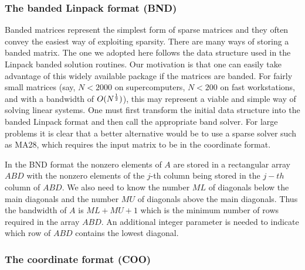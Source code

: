 \documentclass[12pt]{article}
\def\half{{1\over2}}%
\begin{document}
\subsubsection{The banded Linpack format (BND)} 
Banded matrices represent the simplest form of sparse matrices and
they often convey the easiest way of exploiting sparsity.  There are
many ways of storing a banded matrix. The one we adopted here follows
the data structure used in the Linpack banded solution routines. Our
motivation is that one can easily take advantage of this widely available 
package if the matrices are banded.  For fairly small matrices (say,
$N < 2000$ on supercomputers, $ N < 200 $ on fast workstations, and
with a bandwidth of $O(N^{\half} )$), this may represent a viable and
simple way of solving linear systems. One must first transform the
initial data structure into the banded Linpack format and then call the
appropriate band solver. For large problems it is clear that a better
alternative would be to use a sparse solver such as MA28, which
requires the input matrix to be in the coordinate format. 


In the BND format the nonzero elements of $A$ are stored in a
rectangular array $ABD$ with the nonzero elements of the $j$-th column
being stored in the $j-th$ column of $ABD$. We also need to know the
number $ML$ of diagonals below the main diagonals and the number $MU$
of diagonals above the main diagonals. Thus the bandwidth of $A$ is
$ML+MU+1$ which is the minimum number of rows required in the array
$ABD$. An additional integer parameter is needed to indicate which row
of $ABD$ contains the lowest diagonal.

\subsubsection{The coordinate format (COO) } 
\end{document}
